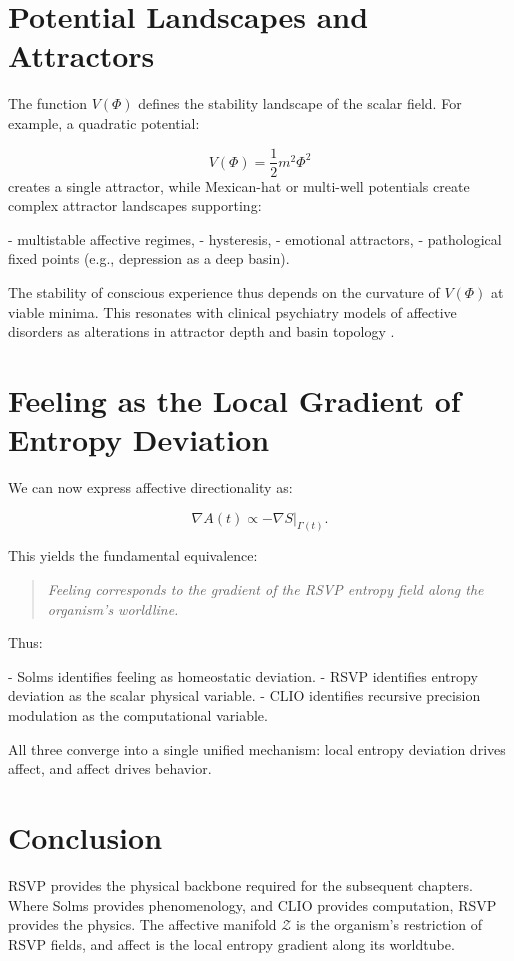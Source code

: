 \documentclass[12pt,oneside]{book}
\theoremstyle{plain}
\theoremstyle{definition}
\let\citep\parencite
\begin{document}
\section{Potential Landscapes and Attractors}

The function $V(\Phi)$ defines the stability landscape of the scalar
field.
For example, a quadratic potential:

\[
V(\Phi) = \frac{1}{2} m^2 \Phi^2
\]
creates a single attractor, while Mexican-hat or multi-well potentials
create complex attractor landscapes supporting:

- multistable affective regimes,
- hysteresis,
- emotional attractors,
- pathological fixed points (e.g., depression as a deep basin).

The stability of conscious experience thus depends on the curvature of
$V(\Phi)$ at viable minima.
This resonates with clinical psychiatry models of affective disorders as
alterations in attractor depth and basin topology
\citep{montague2012computational}.

\section{Feeling as the Local Gradient of Entropy Deviation}

We can now express affective directionality as:

\[
\nabla A(t) \propto - \nabla S|_{\Gamma(t)}.
\]

This yields the fundamental equivalence:

\begin{quote}
\emph{Feeling corresponds to the gradient of the RSVP entropy field along
the organism’s worldline.}
\end{quote}

Thus:

- Solms identifies feeling as homeostatic deviation.
- RSVP identifies entropy deviation as the scalar physical variable.
- CLIO identifies recursive precision modulation as the computational
  variable.

All three converge into a single unified mechanism:
local entropy deviation drives affect, and affect drives behavior.

\section{Conclusion}

RSVP provides the physical backbone required for the subsequent chapters.
Where Solms provides phenomenology, and CLIO provides computation, RSVP
provides the physics.
The affective manifold $\mathcal{Z}$ is the organism’s restriction of
RSVP fields, and affect is the local entropy gradient along its
worldtube.
\end{document}
